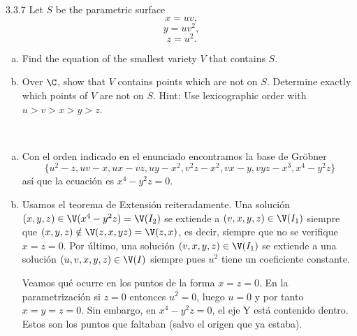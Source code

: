 \documentclass[twoside]{article}
\begin{document}
\begin{ejercicio}{3.3.7}
Let $S$ be the parametric surface
\[x = uv,\]
\[y = uv^2,\]
\[z = u^2.\]
\begin{enumerate}[a.]
\item Find the equation of the smallest variety $V$ that contains $S$.
\item Over $\C$, show that $V$ contains points which are not on $S$. Determine exactly which
points of $V$ are not on $S$. Hint: Use lexicographic order with $u > v > x > y > z$.
\end{enumerate}
\end{ejercicio}
\begin{solucion}\
\begin{enumerate}[a.]
\item Con el orden indicado en el enunciado encontramos la base de Gröbner
\[
\{u^2 - z, uv - x, ux - vz, uy - x^2, v^2z - x^2, vx - y, vyz - x^3, x^4 - y^2z\}
\]
así que la ecuación es $x^4-y^2z=0$. 
\item Usamos el teorema de Extensión reiteradamente. Una solución $(x,y,z)\in\V(x^4-y^2z)=\V(I_2)$ se extiende a $(v,x,y,z)\in \V(I_1)$ siempre que $(x,y,z)\notin\V(z,x,yz)=\V(z,x)$, es decir, siempre que no se verifique $x=z=0$. Por último, una solución $(v,x,y,z)\in\V(I_1)$ se extiende a una solución $(u,v,x,y,z)\in\V(I)$ siempre pues $u^2$ tiene un coeficiente constante. 

Veamos qué ocurre en los puntos de la forma $x=z=0$. En la parametrización si $z=0$ entonces $u^2=0$, luego $u=0$ y por tanto $x=y=z=0$. Sin embargo, en $x^4-y^2z = 0$, el eje Y está contenido dentro. Estos son los puntos que faltaban (salvo el origen que ya estaba).
\end{enumerate}
\end{solucion}


\newpage
\end{document}
